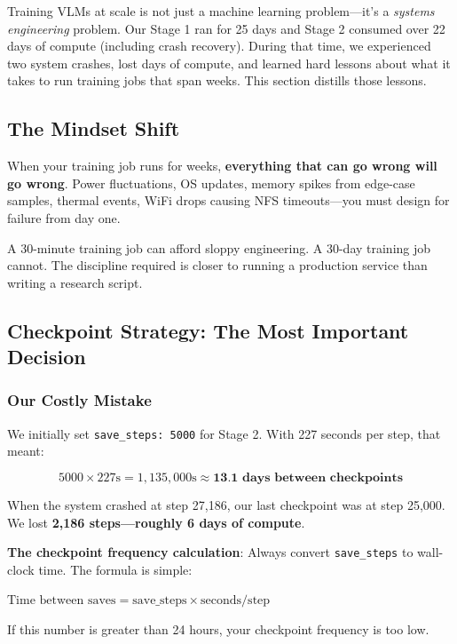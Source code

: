 \documentclass[11pt,a4paper]{article}
\begin{document}
Training VLMs at scale is not just a machine learning problem---it's a \textit{systems engineering} problem. Our Stage 1 ran for 25 days and Stage 2 consumed over 22 days of compute (including crash recovery). During that time, we experienced two system crashes, lost days of compute, and learned hard lessons about what it takes to run training jobs that span weeks. This section distills those lessons.

\subsection{The Mindset Shift}

\begin{keyinsight}
When your training job runs for weeks, \textbf{everything that can go wrong will go wrong}. Power fluctuations, OS updates, memory spikes from edge-case samples, thermal events, WiFi drops causing NFS timeouts---you must design for failure from day one.
\end{keyinsight}

A 30-minute training job can afford sloppy engineering. A 30-day training job cannot. The discipline required is closer to running a production service than writing a research script.

\subsection{Checkpoint Strategy: The Most Important Decision}

\subsubsection{Our Costly Mistake}

We initially set \texttt{save\_steps: 5000} for Stage 2. With 227 seconds per step, that meant:

\begin{equation}
5000 \times 227\text{s} = 1{,}135{,}000\text{s} \approx \textbf{13.1 days between checkpoints}
\end{equation}

When the system crashed at step 27,186, our last checkpoint was at step 25,000. We lost \textbf{2,186 steps---roughly 6 days of compute}.

\begin{warningbox}
\textbf{The checkpoint frequency calculation}: Always convert \texttt{save\_steps} to wall-clock time. The formula is simple:

$\text{Time between saves} = \text{save\_steps} \times \text{seconds/step}$

If this number is greater than 24 hours, your checkpoint frequency is too low.
\end{warningbox}
\end{document}
